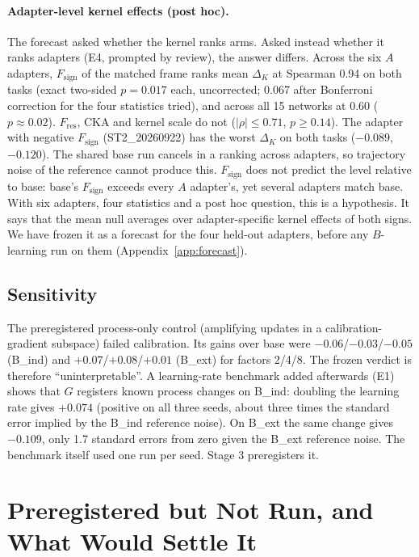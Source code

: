 \documentclass[11pt]{article}
\begin{document}
\paragraph{Adapter-level kernel effects (post hoc).} The forecast asked whether the kernel ranks arms. Asked instead whether it ranks adapters (E4, prompted by review), the answer differs. Across the six $A$ adapters, $F_{\text{sign}}$ of the matched frame ranks mean $\Delta_K$ at Spearman 0.94 on both tasks (exact two-sided $p=0.017$ each, uncorrected; 0.067 after Bonferroni correction for the four statistics tried), and across all 15 networks at 0.60 ($p\approx0.02$). $F_{\text{res}}$, CKA and kernel scale do not ($|\rho|\le0.71$, $p\ge0.14$). The adapter with negative $F_{\text{sign}}$ (ST2\_20260922) has the worst $\Delta_K$ on both tasks ($-0.089$, $-0.120$). The shared base run cancels in a ranking across adapters, so trajectory noise of the reference cannot produce this. $F_{\text{sign}}$ does not predict the level relative to base: base's $F_{\text{sign}}$ exceeds every $A$ adapter's, yet several adapters match base. With six adapters, four statistics and a post hoc question, this is a hypothesis. It says that the mean null averages over adapter-specific kernel effects of both signs. We have frozen it as a forecast for the four held-out adapters, before any $B$-learning run on them (Appendix~\ref{app:forecast}).

\subsection{Sensitivity}\label{sec:sens}
The preregistered process-only control (amplifying updates in a calibration-gradient subspace) failed calibration. Its gains over base were $-0.06$/$-0.03$/$-0.05$ (B\_ind) and $+0.07$/$+0.08$/$+0.01$ (B\_ext) for factors 2/4/8. The frozen verdict is therefore ``uninterpretable''. A learning-rate benchmark added afterwards (E1) shows that $G$ registers known process changes on B\_ind: doubling the learning rate gives $+0.074$ (positive on all three seeds, about three times the standard error implied by the B\_ind reference noise). On B\_ext the same change gives $-0.109$, only 1.7 standard errors from zero given the B\_ext reference noise. The benchmark itself used one run per seed. Stage 3 preregisters it.

\section{Preregistered but Not Run, and What Would Settle It}\label{sec:stage3}
\end{document}
